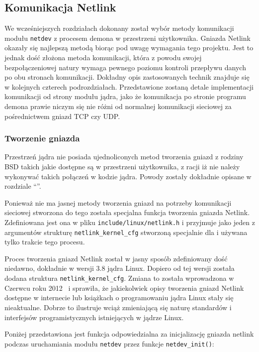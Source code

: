 \documentclass[11pt]{scrartcl}
\begin{document}
\subsection{Komunikacja Netlink}
\label{netlinkcomm}

We wcześniejszych rozdziałach dokonany został wybór metody komunikacji modułu \texttt{netdev} z procesem demona w przestrzeni użytkownika.  Gniazda Netlink okazały się najlepszą metodą biorąc pod uwagę wymagania tego projektu. Jest to jednak dość złożona metoda komunikacji, która z powodu swojej bezpołączeniowej natury wymaga pewnego poziomu kontroli przepływu danych po obu stronach komunikacji. Dokładny opis zastosowanych technik znajduje się w kolejnych czterech podrozdziałach.  Przedstawione zostaną detale implementacji komunikacji od strony modułu jądra, jako że komunikacja po stronie programu demona prawie niczym się nie różni od normalnej komunikacji sieciowej za pośrednictwem gniazd TCP czy UDP.

\subsubsection{Tworzenie gniazda}
\label{sockcreate}

Przestrzeń jądra nie posiada ujednoliconych metod tworzenia gniazd z rodziny BSD takich jakie dostępne są w przestrzeni użytkownika, z racji iż nie należy wykonywać takich połączeń w kodzie jądra. Powody zostały dokładnie opisane w rozdziale ``''.

Ponieważ nie ma jasnej metody tworzenia gniazd na potrzeby komunikacji sieciowej stworzona do tego została specjalna funkcja tworzenia gniazda Netlink. Zdefiniowana jest ona w pliku \texttt{include/linux/netlink.h} i przyjmuje jako jeden z argumentów strukturę \texttt{netlink\_kernel\_cfg} stworzoną specjalnie dla i używana tylko trakcie tego procesu.

Proces tworzenia gniazd Netlink został w jasny sposób zdefiniowany dość niedawno, dokładnie w wersji 3.8 jądra Linux. Dopiero od tej wersji została dodana struktura \texttt{netlink\_kernel\_cfg}. Zmiana to została wprowadzona w Czerwcu roku 2012~\cite{netlinkchange} i sprawiła, że jakiekolwiek opisy tworzenia gniazd Netlink dostępne w internecie lub książkach o programowaniu jądra Linux stały się nieaktualne. Dobrze to ilustruje wciąż zmieniającą się naturę standardów i interfejsów programistycznych istniejących w jądrze Linux.

Poniżej przedstawiona jest funkcja odpowiedzialna za inicjalizację gniazda netlink podczas uruchamiania modułu \texttt{netdev} przez funkcje \texttt{netdev\_init()}:
\end{document}
